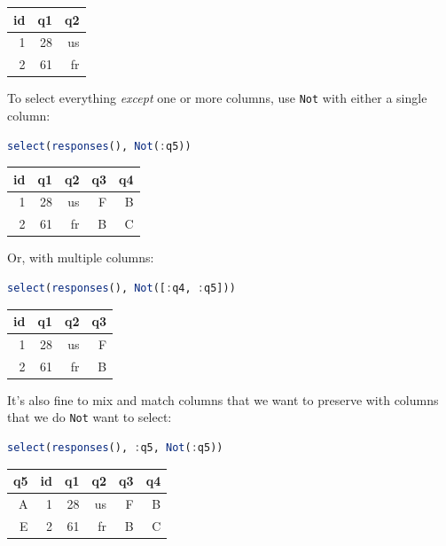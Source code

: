 \documentclass[
  notoc %
]{tufte-book}
\newcommand{\passthrough}[1]{#1}
\begin{document}
\begin{longtable}[]{@{}rrr@{}}
\toprule
id & q1 & q2 \\
\midrule
\endhead
1 & 28 & us \\
2 & 61 & fr \\
\bottomrule
\end{longtable}

To select everything \emph{except} one or more columns, use
\passthrough{\lstinline!Not!} with either a single column:

\begin{lstlisting}[language=Julia]
select(responses(), Not(:q5))
\end{lstlisting}

\begin{longtable}[]{@{}rrrrr@{}}
\toprule
id & q1 & q2 & q3 & q4 \\
\midrule
\endhead
1 & 28 & us & F & B \\
2 & 61 & fr & B & C \\
\bottomrule
\end{longtable}

Or, with multiple columns:

\begin{lstlisting}[language=Julia]
select(responses(), Not([:q4, :q5]))
\end{lstlisting}

\begin{longtable}[]{@{}rrrr@{}}
\toprule
id & q1 & q2 & q3 \\
\midrule
\endhead
1 & 28 & us & F \\
2 & 61 & fr & B \\
\bottomrule
\end{longtable}

It's also fine to mix and match columns that we want to preserve with
columns that we do \passthrough{\lstinline!Not!} want to select:

\begin{lstlisting}[language=Julia]
select(responses(), :q5, Not(:q5))
\end{lstlisting}

\begin{longtable}[]{@{}rrrrrr@{}}
\toprule
q5 & id & q1 & q2 & q3 & q4 \\
\midrule
\endhead
A & 1 & 28 & us & F & B \\
E & 2 & 61 & fr & B & C \\
\bottomrule
\end{longtable}
\end{document}
